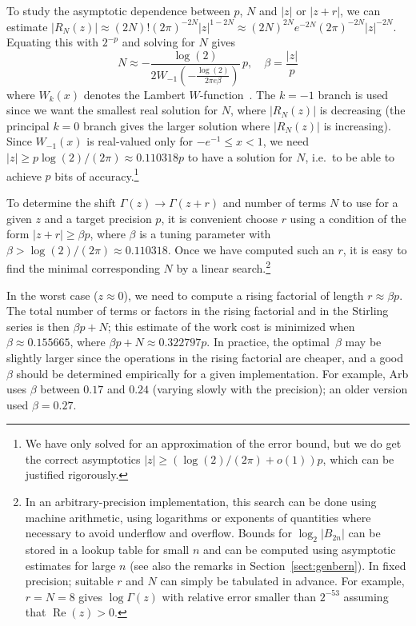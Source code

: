 \documentclass[reqno]{amsart}
\theoremstyle{definition}
\begin{document}
To study the asymptotic dependence between $p$, $N$ and $|z|$ or $|z+r|$,
we can estimate $|R_N(z)| \approx (2N)! (2 \pi)^{-2N} |z|^{1-2N} \approx (2N)^{2N} e^{-2N} (2 \pi)^{-2N} |z|^{-2N}$.
Equating this with $2^{-p}$ and solving for $N$ gives
\begin{equation}
N \approx -\frac{\log(2)}{2 W_{-1}\!\left(-\frac{\log(2)}{2 \pi e \beta}\right)} \, p, \quad \beta = \frac{|z|}{p}
\end{equation}
where $W_k(x)$ denotes the Lambert $W$-function~\cite{Corless1996}.
The $k = -1$ branch is used since we want the smallest real solution for $N$,
where $|R_N(z)|$ is decreasing (the principal $k = 0$ branch gives
the larger solution where $|R_N(z)|$ is increasing).
Since $W_{-1}(x)$ is real-valued only for $-e^{-1} \le x < 1$, we need
$|z| \ge p \log(2) / (2 \pi) \approx  0.110318 p$ to have a solution for $N$, i.e.\ to be able to
achieve $p$ bits of accuracy.\footnote{We have only solved for an approximation of the error bound,
but we do get the correct asymptotics $|z| \ge (\log(2) / (2 \pi) + o(1)) p$, which can be justified rigorously.}

To determine the shift $\Gamma(z) \to \Gamma(z+r)$ and number of terms $N$
to use for a given $z$ and a target precision $p$,
it is convenient choose $r$ using a condition
of the form
$|z+r| \ge \beta p$, where $\beta$ is a tuning parameter with $\beta > \log(2) / (2 \pi) \approx  0.110318$.
Once we have computed such an $r$, it is easy to find the minimal corresponding $N$ by a linear search.\footnote{In an arbitrary-precision implementation, this search can be done using machine
arithmetic, using logarithms or exponents of quantities where necessary to avoid underflow and overflow.
Bounds for $\log_2 |B_{2n}|$ can be stored in a lookup table for small $n$ and can be computed using asymptotic
estimates for large $n$ (see also the remarks in Section~\ref{sect:genbern}).
In fixed precision; suitable $r$ and $N$ can simply
be tabulated in advance. For example, $r = N = 8$
gives $\log \Gamma(z)$ with relative error smaller than $2^{-53}$
assuming that $\operatorname{Re}(z) > 0$.}

In the worst case ($z \approx 0$),
we need to compute a rising factorial of length $r \approx \beta p$.
The total number of terms or factors in the rising factorial and in the
Stirling series is then $\beta p + N$; this estimate of the work
cost is minimized when $\beta \approx 0.155665$, where $\beta p + N \approx 0.322797 p$.
In practice, the optimal~$\beta$ may be slightly larger
since the operations in the rising factorial are cheaper,
and a good $\beta$ should be determined empirically for a given implementation.
For example, Arb uses $\beta$ between $0.17$ and $0.24$ (varying slowly
with the precision); an older version used $\beta = 0.27$.
\end{document}
